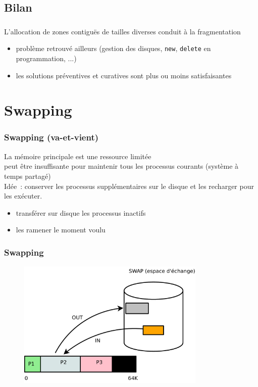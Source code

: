 \subsection{Bilan}
\begin{frame}
\frametitle{\insertsubsection}

L'allocation de zones \alert{contiguës} de tailles diverses conduit à la
\alert{fragmentation}

\begin{itemize}
\item problème retrouvé ailleurs (gestion des disques,
 \texttt{new}, \texttt{delete} en programmation, ...)
\item les solutions préventives et curatives
  sont plus ou moins satisfaisantes
\end{itemize}
\end{frame}


\section{Swapping}
\begin{frame}
  \frametitle{Swapping (va-et-vient)}
  La mémoire principale est une ressource limitée\\
   peut être insuffisante pour maintenir tous les processus courants 
  (système à temps partagé)\\
 
  \vspace{0.5cm}
  Idée~: conserver les processus supplémentaires sur le disque et les recharger pour
  les exécuter.
  \begin{itemize}
  \item transférer sur disque les processus inactifs
  \item les ramener le moment voulu
  \end{itemize}
 \end{frame}

\begin{frame}
\frametitle{Swapping}
\begin{figure}[h]
  \includegraphics[width=0.8\textwidth]{fig2/swapping-segment}
\end{figure}
\end{frame}

